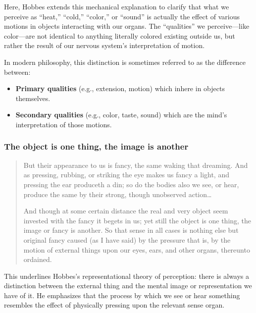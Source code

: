             Here, Hobbes extends this mechanical explanation to clarify that what we perceive as “heat,” “cold,” “color,” or “sound” is actually the effect of various motions in objects interacting with our organs. The “qualities” we perceive—like color—are not identical to anything literally colored existing outside us, but rather the result of our nervous system’s interpretation of motion.

            In modern philosophy, this distinction is sometimes referred to as the difference between:

            \begin{itemize}
                \item \textbf{Primary qualities} (e.g., extension, motion) which inhere in objects themselves.
                \item \textbf{Secondary qualities} (e.g., color, taste, sound) which are the mind’s interpretation of those motions.
            \end{itemize}

        \subsubsection{The object is one thing, the image is another}

            \begin{quote}
                But their appearance to us is fancy, the same waking that dreaming. And as pressing, rubbing, or striking the eye makes us fancy a light, and pressing the ear produceth a din; so do the bodies also we see, or hear, produce the same by their strong, though unobserved action…

                And though at some certain distance the real and very object seem invested with the fancy it begets in us; yet still the object is one thing, the image or fancy is another. So that sense in all cases is nothing else but original fancy caused (as I have said) by the pressure that is, by the motion of external things upon our eyes, ears, and other organs, thereunto ordained.
            \end{quote}

            This underlines Hobbes’s representational theory of perception: there is always a distinction between the external thing and the mental image or representation we have of it. He emphasizes that the process by which we see or hear something resembles the effect of physically pressing upon the relevant sense organ.

